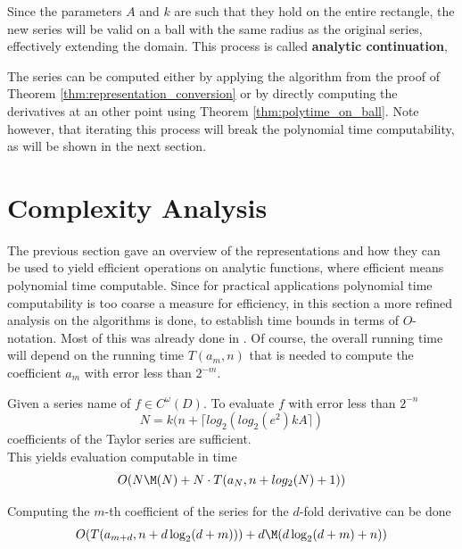 		Since the parameters $A$ and $k$ are such that they hold on the entire rectangle, 
		the new series will be valid on a ball with the same radius as the original series, effectively extending the domain.
		This process is called \textbf{analytic continuation},
		
		The series can be computed either by applying the algorithm from the proof of Theorem \ref{thm:representation_conversion} or by directly computing the derivatives at an other point using Theorem \ref{thm:polytime_on_ball}.
		Note however, that iterating this process will break the polynomial time computability, as will be shown in the next
		section.
	\section{Complexity Analysis}
		The previous section gave an overview of the representations and how they can be used to yield efficient 
		operations on analytic functions, where efficient means polynomial time computable.
		Since for practical applications polynomial time computability is too coarse a measure for efficiency, 
		in this section a more refined analysis on the algorithms is done, to establish time bounds in terms of $O$-notation.
		Most of this was already done in \cite{mypaper}.
		Of course, the overall running time will depend on the running time $T(a_m, n)$ that is needed to 
		compute the coefficient $a_m$ with error less than $2^{-m}$.
		\begin{theorem}
			Given a series name of $f \in C^\omega(D)$.
			To evaluate $f$ with error less than $2^{-n}$ 
			$$N = k(n+\lceil log_2(log_2 (e^2) kA \rceil)$$
			coefficients of the Taylor series are sufficient. \\
			This yields evaluation computable in time 
			$$ O(N\M(N)+N \cdot T(a_N, n+log_2(N)+1)) $$ 
		\end{theorem}

		\begin{theorem}
			Computing the $m$-th coefficient of the series for the $d$-fold derivative can be done
			$$ O(T(a_{m+d}, n+d\log_2(d+m)))+d\M(d \log_2 (d+m)+n)) $$
		\end{theorem}


